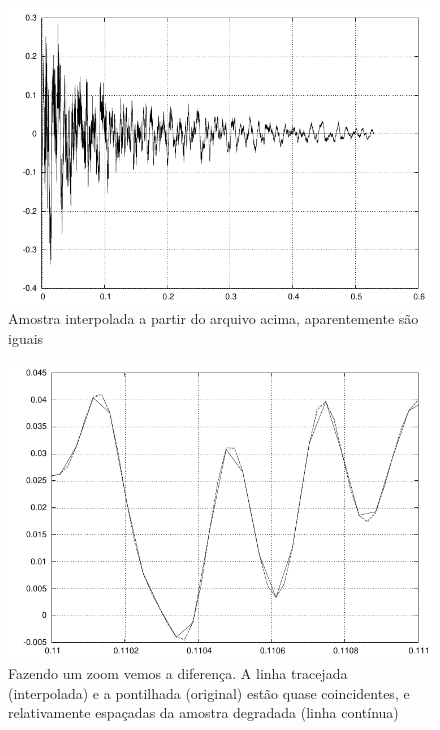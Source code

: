\clearpage

\begin{figure}[h]
\begin{center}
\leavevmode
\includegraphics[scale=1]{../img/drum01-22050-interp.pdf} 
\caption{Amostra interpolada a partir do arquivo acima, aparentemente são iguais}
\end{center}
\end{figure}

\begin{figure}[h]
\begin{center}
\leavevmode
\includegraphics[scale=1]{../img/drum01-22050-comp.pdf} 
\caption{Fazendo um zoom vemos a diferença.  A linha tracejada (interpolada) e a pontilhada (original) estão quase coincidentes, e relativamente espaçadas da amostra degradada (linha contínua)}
\end{center}
\end{figure}

